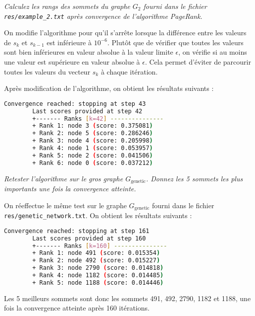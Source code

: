 \textit{Calculez les rangs des sommets du graphe $G_2$ fourni dans le fichier \texttt{res/example\_2.txt} après convergence de l'algorithme PageRank.}

On modifie l'algorithme pour qu'il s'arrête lorsque la différence entre les valeurs de $s_k$ et $s_{k-1}$ est inférieure à $10^{-6}$. Plutôt que de vérifier que toutes les valeurs sont bien inférieures en valeur absolue à la valeur limite $\epsilon$, on vérifie si au moins une valeur est supérieure en valeur absolue à $\epsilon$. Cela permet d'éviter de parcourir toutes les valeurs du vecteur $s_k$ à chaque itération.

Après modification de l'algorithme, on obtient les résultats suivants :

\begin{minipage}{\dimexpr\linewidth-20pt}
    \begin{lstlisting}[language=bash, caption={Résultat de l'algorithme PageRank après convergence sur le graphe $G_2$, avec $\alpha = 0.9$ et $\epsilon = 1.0 \times 10^{-10}$.}]
        Convergence reached: stopping at step 43
        Last scores provided at step 42
        +------- Ranks [k=42] ---------------
        + Rank 1: node 3 (score: 0.375081)
        + Rank 2: node 5 (score: 0.286246)
        + Rank 3: node 4 (score: 0.205998)
        + Rank 4: node 1 (score: 0.053957)
        + Rank 5: node 2 (score: 0.041506)
        + Rank 6: node 0 (score: 0.037212)
    \end{lstlisting}
\end{minipage}

\textit{Retester l'algorithme sur le gros graphe $G_\text{genetic}$. Donnez les 5 sommets les plus importants une fois la convergence atteinte.}

On réeffectue le même test sur le graphe $G_\text{genetic}$ fourni dans le fichier \texttt{res/genetic\_network.txt}. On obtient les résultats suivants :

\begin{minipage}{\dimexpr\linewidth-20pt}
    \begin{lstlisting}[language=bash, caption={Résultat de l'algorithme PageRank après convergence sur le graphe $G_2$, avec $\alpha = 0.9$ et $\epsilon = 1.0 \times 10^{-10}$.}]
        Convergence reached: stopping at step 161
        Last scores provided at step 160
        +------- Ranks [k=160] ---------------
        + Rank 1: node 491 (score: 0.015354)
        + Rank 2: node 492 (score: 0.015227)
        + Rank 3: node 2790 (score: 0.014818)
        + Rank 4: node 1182 (score: 0.014485)
        + Rank 5: node 1188 (score: 0.014446)
    \end{lstlisting}
\end{minipage}

Les 5 meilleurs sommets sont donc les sommets 491, 492, 2790, 1182 et 1188, une fois la convergence atteinte après 160 itérations.


